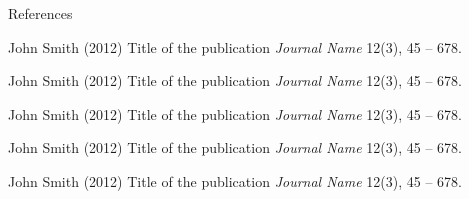 \documentclass[aspectratio=169,xcolor=dvipsnames]{beamer}
\begin{document}
\begin{frame}{References}
    \footnotesize{
        \begin{thebibliography}{99}
             John Smith (2012)
            \newblock Title of the publication
            \newblock \emph{Journal Name} 12(3), 45 -- 678.
        \end{thebibliography}
        
        \begin{thebibliography}{99}
             John Smith (2012)
            \newblock Title of the publication
            \newblock \emph{Journal Name} 12(3), 45 -- 678.
        \end{thebibliography}
        
        \begin{thebibliography}{99}
             John Smith (2012)
            \newblock Title of the publication
            \newblock \emph{Journal Name} 12(3), 45 -- 678.
        \end{thebibliography}
        
        \begin{thebibliography}{99}
             John Smith (2012)
            \newblock Title of the publication
            \newblock \emph{Journal Name} 12(3), 45 -- 678.
        \end{thebibliography}
        
        \begin{thebibliography}{99}
             John Smith (2012)
            \newblock Title of the publication
            \newblock \emph{Journal Name} 12(3), 45 -- 678.
        \end{thebibliography}
    }
\end{frame}



\end{document}
